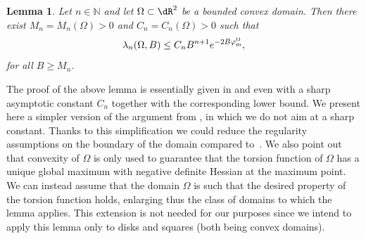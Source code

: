 \documentclass[11pt,a4paper]{amsart}
\numberwithin{figure}{section}
\numberwithin{equation}{section}
\theoremstyle{plain}%
\theoremstyle{remark}
\theoremstyle{plain}
\def\N{\mathbb{N}}
\newtheorem{lemma}[theorem]{Lemma}
\begin{document}
\begin{lemma}\label{lem.disk}
Let $n \in \N$ and let $\Omega\subset\dR^2$ be a bounded convex domain. Then there exist $M_n  = M_n(\Omega) >0$ and $C_n = C_n(\Omega) >0$ such that
\[ \lambda_n(\Omega,B) \leq C_n B^{n+1} e^{-2B \varphi_{\rm m}^\Omega},\]
for all $B \geq M_n$.
\end{lemma}

The proof of the above lemma is essentially given in \cite{MagneticPauli} and even with a sharp asymptotic constant $C_n$ together with the corresponding lower bound. We present here a simpler version of the argument from \cite{MagneticPauli}, in which we do not aim at a sharp constant. Thanks to this simplification we could reduce the regularity assumptions on the boundary of the domain compared to~\cite{MagneticPauli}. We also point out that convexity of $\Omega$ is only used to guarantee that the torsion function of $\Omega$ has a unique global maximum with negative definite Hessian at the maximum point. We can instead assume that the domain $\Omega$ is such that the desired property of the torsion function holds, enlarging thus the class of domains to which the lemma applies. This extension is not needed for our purposes since we intend to apply this lemma only to disks and squares (both being convex domains).
\end{document}
